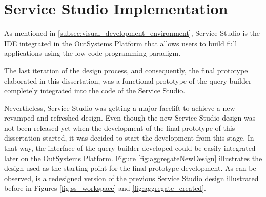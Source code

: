 









\section{Service Studio Implementation}
\label{sec:service_studio_implementation}

As mentioned in \ref{subsec:visual_development_environment}, Service Studio is the \gls{IDE} integrated in the OutSystems Platform that allows users to build full applications using the low-code programming paradigm.

The last iteration of the design process, and consequently, the final prototype elaborated in this dissertation, was a functional prototype of the query builder completely integrated into the code of the Service Studio.

Nevertheless, Service Studio was getting a major facelift to achieve a new revamped and refreshed design. Even though the new Service Studio design was not been released yet when the development of the final prototype of this dissertation started, it was decided to start the development from this stage. In that way, the interface of the query builder developed could be easily integrated later on the OutSystems Platform. Figure \ref{fig:aggregateNewDesign} illustrates the design used as the starting point for the final prototype development. As can be observed, is a redesigned version of the previous Service Studio design illustrated before in Figures \ref{fig:ss_workspace} and \ref{fig:aggregate_created}.

